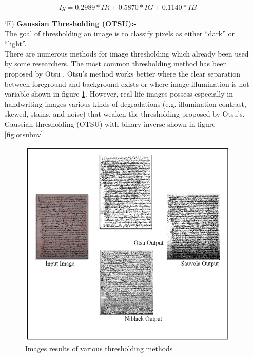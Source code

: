 \begin{itemize}[labelindent=1em,labelsep=0.25cm,leftmargin=*]
        \begin{equation}
            Ig = 0.2989 * IR + 0.5870 * IG + 0.1140 * IB
            \label{equ:gray}
        \end{equation}
        \item[\char `E)] \textbf{Gaussian Thresholding (OTSU):-}\\
        The goal of thresholding \cite{thresholding} an image is to classify pixels as either “dark” or “light”.\\
        There are numerous methods for image thresholding which already been used by some researchers. The most common thresholding method has been proposed by Otsu . Otsu’s method works better where the clear separation between foreground and background exists or where image illumination is not variable shown in figure \ref{fig:otsu}. However, real-life images possess especially in handwriting images various kinds of degradations (e.g. illumination contrast, skewed, stains, and noise) that weaken the thresholding proposed by Otsu’s. Gaussian thresholding (OTSU) with binary inverse shown in figure \ref{fig:otsubnv}.
        \begin{figure}[!htb]
            \centering
            \includegraphics[width=11cm]{images/otsu.png}
            \caption{Images results of various thresholding methods}
            \label{fig:otsu}
        \end{figure}
        

\end{itemize}
